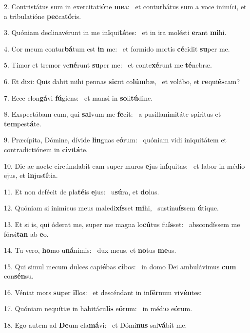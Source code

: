 2. Contristátus sum in exercitati\textbf{ó}ne \textbf{me}a: \ast\  et conturbátus sum a voce inimíci, et a tribulatióne \textbf{pec}ca\textbf{tó}ris.\

3. Quóniam declinavérunt in me in\textbf{i}qui\textbf{tá}tes: \ast\  et in ira molésti \textbf{e}rant \textbf{mi}hi.\

4. Cor meum contur\textbf{bá}tum est \textbf{in} me: \ast\  et formído mortis \textbf{cé}cidit \textbf{su}per me.\

5. Timor et tremor ve\textbf{né}runt \textbf{su}per me: \ast\  et conte\textbf{xé}runt me \textbf{té}nebræ.\

6. Et dixi: Quis dabit mihi pennas \textbf{sic}ut co\textbf{lúm}bæ, \ast\  et volábo, et \textbf{re}qui\textbf{és}cam?\

7. Ecce elon\textbf{gá}vi \textbf{fú}giens: \ast\  et mansi in \textbf{so}li\textbf{tú}dine.\

8. Exspectábam eum, qui \textbf{sal}vum me \textbf{fe}cit: \ast\  a pusillanimitáte spíritus et \textbf{tem}pes\textbf{tá}te.\

9. Præcípita, Dómine, dívide \textbf{lin}guas e\textbf{ó}rum: \ast\  quóniam vidi iniquitátem et contradictiónem in \textbf{ci}vi\textbf{tá}te.\

10. Die ac nocte circúmdabit eam super muros \textbf{e}jus in\textbf{í}quitas: \ast\  et labor in médio ejus, et \textbf{in}jus\textbf{tí}tia.\

11. Et non defécit de pla\textbf{té}is \textbf{e}jus: \ast\  u\textbf{sú}ra, et \textbf{do}lus.\

12. Quóniam si inimícus meus maledi\textbf{xís}set \textbf{mi}hi, \ast\  sustinu\textbf{ís}sem \textbf{ú}tique.\

13. Et si is, qui óderat me, super me magna lo\textbf{cú}tus fu\textbf{ís}set: \ast\  abscondíssem me fórsi\textbf{tan} ab \textbf{e}o.\

14. Tu vero, \textbf{ho}mo u\textbf{ná}nimis: \ast\  dux meus, et \textbf{no}tus \textbf{me}us.\

15. Qui simul mecum dulces capi\textbf{é}bas \textbf{ci}bos: \ast\  in domo Dei ambulávimus \textbf{cum} con\textbf{sén}su.\

16. Véniat mors \textbf{su}per \textbf{il}los: \ast\  et descéndant in in\textbf{fér}num vi\textbf{vén}tes:\

17. Quóniam nequítiæ in habitácu\textbf{lis} e\textbf{ó}rum: \ast\  in médi\textbf{o} e\textbf{ó}rum.\

18. Ego autem ad \textbf{De}um cla\textbf{má}vi: \ast\  et Dómi\textbf{nus} sal\textbf{vá}bit me.\

